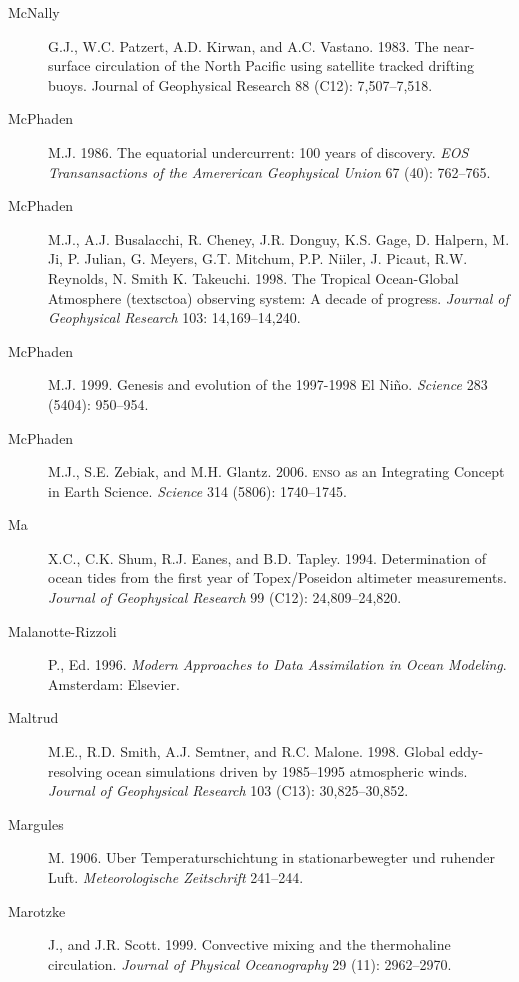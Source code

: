 \begin{description}
\item [McNally]G.J., W.C. Patzert, A.D. Kirwan, and
  A.C. Vastano. 1983. The near-surface circulation of the North
  Pacific using satellite tracked drifting buoys. Journal of
  Geophysical Research 88 (C12): 7,507--7,518.

\item [McPhaden]M.J. 1986. The equatorial undercurrent: 100 years of
  discovery. \textit{EOS Transansactions of the Amererican Geophysical
    Union} 67 (40): 762--765.

\item [McPhaden]M.J., A.J. Busalacchi, R. Cheney, J.R. Donguy,
  K.S. Gage, D. Halpern, M. Ji, P. Julian, G. Meyers, G.T. Mitchum,
  P.P. Niiler, J. Picaut, R.W. Reynolds, N. Smith
  K. Takeuchi. 1998. The Tropical Ocean-Global Atmosphere
  (textsc{toa}) observing system: A decade of progress.
  \textit{Journal of Geophysical Research} 103: 14,169--14,240.

\item [McPhaden]M.J. 1999. Genesis and evolution of the 1997-1998 El
  Ni\~{n}o. \textit{Science} 283 (5404): 950--954.

\item [McPhaden]M.J., S.E. Zebiak, and
  M.H. Glantz. 2006. \textsc{enso} as an Integrating Concept in Earth
  Science. \textit{Science} 314 (5806): 1740--1745.

\item [Ma]X.C., C.K. Shum, R.J. Eanes, and
  B.D. Tapley. 1994. Determination of ocean tides from the first year
  of Topex/Poseidon altimeter measurements. \textit{Journal of
    Geophysical Research} 99 (C12): 24,809--24,820.

\item [Malanotte-Rizzoli]P., Ed. 1996. \textit{Modern Approaches to
  Data Assimilation in Ocean Modeling}. Amsterdam: Elsevier.

\item [Maltrud]M.E., R.D. Smith, A.J. Semtner, and
  R.C. Malone. 1998. Global eddy-resolving ocean simulations driven by
  1985--1995 atmospheric winds.  \textit{Journal of Geophysical
    Research} 103 (C13): 30,825--30,852.

\item [Margules]M. 1906. Uber Temperaturschichtung in
  stationarbewegter und ruhender Luft. \textit{Meteorologische
    Zeitschrift} 241--244.

\item [Marotzke]J., and J.R. Scott. 1999. Convective mixing and the
  thermohaline circulation. \textit{Journal of Physical Oceanography}
  29 (11): 2962--2970.


\end{description}
